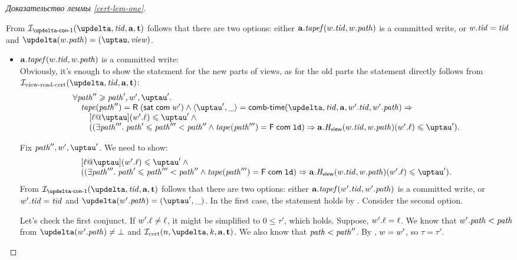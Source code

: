 \begin{proof}[Доказательство леммы \ref{cert-lem-one}]
\begin{itemize}
      From $\invDeltaDefOne(\delta, \tId, \aT, \tT)$ follows that there are two options:
      either $\mathbf{a}.\mathit{tapef}(w.\mathit{tid}, w.\mathit{path})$ is a committed write, or $w.\mathit{tid} = \mathit{tid}$ and $\delta(\w.\cpath) = (\tau, \R)$.
      \begin{itemize}
        \item $\mathbf{a}.\mathit{tapef}(w.\mathit{tid}, w.\mathit{path})$ is a committed write: \\
      Obviously, it's enough to show the statement for the new parts of views, as for the old parts the statement directly
      follows from $\invViewReadCERT(\delta, \tId, \aT, \tT)$:
      \[\begin{array}{l}
  \forall \cpath'' \ge \cpath', \w', \tau'. \\
\quad \tape(\cpath'') = \tapeRead{(\tapeSatisfied{\Committed}{\w'})} \land
   \angled{\tau', \_} = \deltaHmap(\delta, \tId, \aT, \w'.\tId, \w'.\cpath) \Rightarrow \\
\qquad [\loc @ \tau](\w'.\loc) \le \tau' \land {} \\
\qquad ((\exists \cpath'''. \; \cpath' \le \cpath''' < \cpath'' \land 
             \tape(\cpath''') = \tapeFence{\Committed}{\LD}) \Rightarrow \aT.\rmap(\w.\tId, \w.\cpath)(\w'.\loc) \le \tau'). \\
      \end{array}\]

      Fix $\cpath'', \w', \tau'$. We need to show:
      \[\begin{array}{l}
        [\loc @ \tau](\w'.\loc) \le \tau' \land {} \\
        ((\exists \cpath'''. \; \cpath' \le \cpath''' < \cpath'' \land 
             \tape(\cpath''') = \tapeFence{\Committed}{\LD}) \Rightarrow \aT.\rmap(\w.\tId, \w.\cpath)(\w'.\loc) \le \tau'). \\
      \end{array}\]
      From $\invDeltaDefOne(\delta, \tId, \aT, \tT)$ follows that there are two options:
      either $\mathbf{a}.\mathit{tapef}(w'.\mathit{tid}, w'.\mathit{path})$ is a committed write, or $w'.\mathit{tid} = \mathit{tid}$ and $\delta(\w'.\cpath) = (\tau', \_)$.
      In the first case, the statement holds by \app{\ref{thm:invAview}}. Consider the second option.
      
      Let's check the first conjunct. If $w'.\ell \not = \ell$, it might be simplified to $0 \le \tau'$, which holds.
      Suppose, $w'.\ell = \ell$.
      We know that $w'.\mathit{path} < \mathit{path}$ from $\delta(\w'.\cpath) \not = \bot$ and $\invCert(n, \delta, k, \aT, \tT)$.
      We also know that $\mathit{path} < \mathit{path}''$. By \app{\ref{inv:invAReadRead}}, $w = w'$, so $\tau = \tau'$.
      

\end{itemize}
\end{itemize}
\end{proof}
